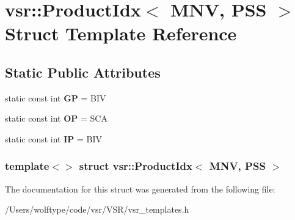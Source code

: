 \hypertarget{structvsr_1_1_product_idx_3_01_m_n_v_00_01_p_s_s_01_4}{\section{vsr\-:\-:Product\-Idx$<$ M\-N\-V, P\-S\-S $>$ Struct Template Reference}
\label{structvsr_1_1_product_idx_3_01_m_n_v_00_01_p_s_s_01_4}
}
\subsection*{Static Public Attributes}
\begin{DoxyCompactItemize}
\item 
\hypertarget{structvsr_1_1_product_idx_3_01_m_n_v_00_01_p_s_s_01_4_a3b290321ea5e9d0176b852169104bb0e}{static const int {\bfseries G\-P} = B\-I\-V}\label{structvsr_1_1_product_idx_3_01_m_n_v_00_01_p_s_s_01_4_a3b290321ea5e9d0176b852169104bb0e}

\item 
\hypertarget{structvsr_1_1_product_idx_3_01_m_n_v_00_01_p_s_s_01_4_a7e3284ba7a6745fb55d3f90f330d9e82}{static const int {\bfseries O\-P} = S\-C\-A}\label{structvsr_1_1_product_idx_3_01_m_n_v_00_01_p_s_s_01_4_a7e3284ba7a6745fb55d3f90f330d9e82}

\item 
\hypertarget{structvsr_1_1_product_idx_3_01_m_n_v_00_01_p_s_s_01_4_a1e591bfeacd04ddc5711c0377a3f8674}{static const int {\bfseries I\-P} = B\-I\-V}\label{structvsr_1_1_product_idx_3_01_m_n_v_00_01_p_s_s_01_4_a1e591bfeacd04ddc5711c0377a3f8674}

\end{DoxyCompactItemize}
\subsubsection*{template$<$$>$ struct vsr\-::\-Product\-Idx$<$ M\-N\-V, P\-S\-S $>$}



The documentation for this struct was generated from the following file\-:\begin{DoxyCompactItemize}
\item 
/\-Users/wolftype/code/vsr/\-V\-S\-R/vsr\-\_\-templates.\-h\end{DoxyCompactItemize}
